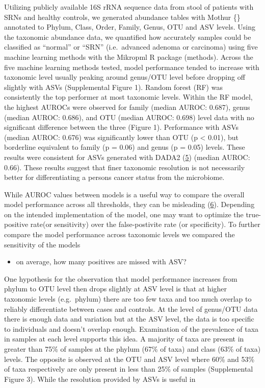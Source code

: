 \documentclass[
]{article}
\providecommand{\tightlist}{%
  \setlength{\itemsep}{0pt}\setlength{\parskip}{0pt}}
\begin{document}
Utilizing publicly available 16S rRNA sequence data from stool of
patients with SRNs and healthy controls, we generated abundance tables
with Mothur \{\} annotated to Phylum, Class, Order, Family, Genus, OTU
and ASV levels. Using the taxonomic abundance data, we quantified how
accurately samples could be classified as ``normal'' or ``SRN''
(i.e.~advanced adenoma or carcinoma) using five machine learning methods
with the Mikropml R package (methods). Across the five machine learning
methods tested, model performance tended to increase with taxonomic
level usually peaking around genus/OTU level before dropping off
slightly with ASVs (Supplemental Figure 1). Random forest (RF) was
consistently the top performer at most taxonomic levels. Within the RF
model, the highest AUROCs were observed for family (median AUROC:
0.687), genus (median AUROC: 0.686), and OTU (median AUROC: 0.698) level
data with no significant difference between the three (Figure 1).
Performance with ASVs (median AUROC: 0.676) was significantly lower than
OTU (p \textless{} 0.01), but borderline equivalent to family (p = 0.06)
and genus (p = 0.05) levels. These results were consistent for ASVs
generated with DADA2 (\protect\hyperlink{ref-callahan2016}{5}) (median
AUROC: 0.66). These results suggest that finer taxonomic resolution is
not necessarily better for differentiating a persons cancer status from
the microbiome.

While AUROC values between models is a useful way to compare the overall
model performance across all thresholds, they can be misleading
(\protect\hyperlink{ref-lobo2008}{6}). Depending on the intended
implementation of the model, one may want to optimize the true-positive
rate(or sensitivity) over the false-postivite rate (or specificity). To
further compare the model performance across taxonomic levels we
compared the sensitivity of the models

\begin{itemize}
\tightlist
\item
  on average, how many positives are missed with ASV?
\end{itemize}

One hypothesis for the observation that model performance increases from
phylum to OTU level then drops slightly at ASV level is that at higher
taxonomic levels (e.g.~phylum) there are too few taxa and too much
overlap to reliably differentiate between cases and controls. At the
level of genus/OTU data there is enough data and variation but at the
ASV level, the data is too specific to individuals and doesn't overlap
enough. Examination of the prevalence of taxa in samples at each level
supports this idea. A majority of taxa are present in greater than 75\%
of samples at the phylum (67\% of taxa) and class (63\% of taxa) levels.
The opposite is observed at the OTU and ASV level where 60\% and 53\% of
taxa respectively are only present in less than 25\% of samples
(Supplemental Figure 3). While the resolution provided by ASVs is useful
in
\end{document}
